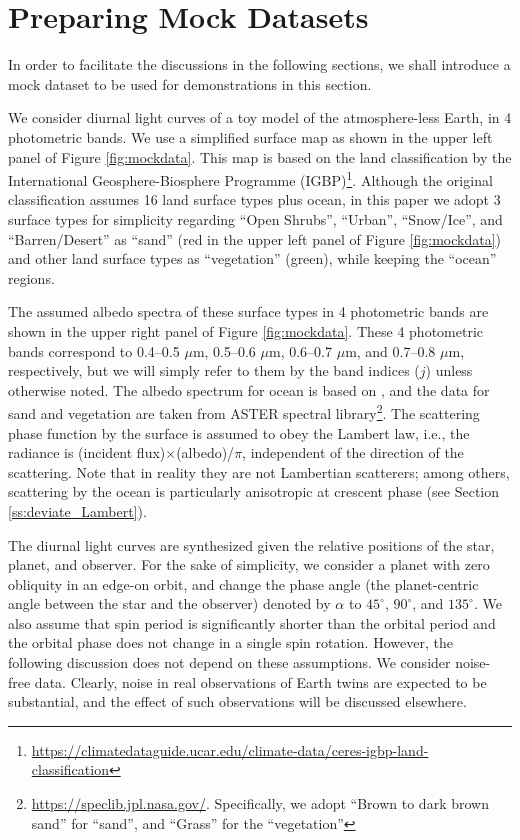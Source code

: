 \documentclass[iop,numberedappendix,apj]{emulateapj}
\begin{document}
\section{Preparing Mock Datasets}
\label{s:mockdata}

In order to facilitate the discussions in the following sections, we shall introduce a mock dataset to be used for demonstrations in this section. 

We consider diurnal light curves of a toy model of the atmosphere-less Earth, in 4 photometric bands. 
We use a simplified surface map as shown in the upper left panel of Figure \ref{fig:mockdata}. 
This map is based on the land classification by the International Geosphere-Biosphere Programme (IGBP)\footnote{\url{https://climatedataguide.ucar.edu/climate-data/ceres-igbp-land-classification}}. 
Although the original classification assumes 16 land surface types plus ocean, in this paper we adopt 3 surface types for simplicity regarding ``Open Shrubs'', ``Urban'', ``Snow/Ice'', and ``Barren/Desert'' as ``sand'' (red in the upper left panel of Figure \ref{fig:mockdata}) and other land surface types as ``vegetation'' (green), while keeping the ``ocean'' regions. 

The assumed albedo spectra of these surface types in 4 photometric bands are shown in the upper right panel of Figure \ref{fig:mockdata}. 
These 4 photometric bands correspond to 0.4--0.5 $\mu $m, 0.5--0.6 $\mu $m, 0.6--0.7 $\mu $m, and 0.7--0.8 $\mu $m, respectively, but we will simply refer to them by the band indices ($j$) unless otherwise noted. 
The albedo spectrum for ocean is based on \citet{Mclinden1997}, 
and the data for sand and vegetation are taken from ASTER spectral library\footnote{\url{https://speclib.jpl.nasa.gov/}. 
Specifically, we adopt  ``Brown to dark brown sand'' for ``sand'', and ``Grass'' for the ``vegetation''}. 
The scattering phase function by the surface is assumed to obey the Lambert law, i.e., the radiance is (incident flux)$\times $(albedo)/$\pi$, independent of the direction of the scattering. 
Note that in reality they are not Lambertian scatterers; among others,  scattering by the ocean is particularly anisotropic at crescent phase (see Section \ref{ss:deviate_Lambert}).  

The diurnal light curves are synthesized given the relative positions of the star, planet, and observer. 
For the sake of simplicity, we consider a planet with zero obliquity in an edge-on orbit, and change the phase angle (the planet-centric angle between the star and the observer) denoted by $\alpha $ to $45^{\circ }$, $90^{\circ }$, and $135^{\circ }$. 
We also assume that spin period is significantly shorter than the orbital period and the orbital phase does not change in a single spin rotation. 
However, the following discussion does not depend on these assumptions. 
We consider noise-free data. Clearly, noise in real observations of Earth twins are expected to be substantial, and the effect of such observations will be discussed elsewhere. 
\end{document}

